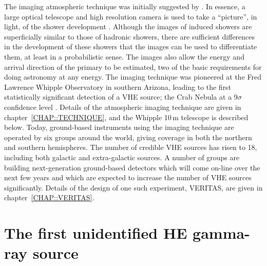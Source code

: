 The imaging atmospheric \Cerenkov technique was initially suggested by
\citet{REF::WEEKES_TURVER::RAGR1977}. In essence, a large optical
telescope and high resolution camera is used to take a ``picture'', in
\Cerenkov light, of the shower development \citep{REF::FEGAN::NIM1983}. 
Although the images of \Gray induced showers are superficially similar
to those of hadronic showers, there are sufficient differences in the
development of these showers that the images can be used to
differentiate them, at least in a probabilistic sense. The images also
allow the energy and arrival direction of the primary \Grays to be
estimated, two of the basic requirements for doing astronomy at any
energy. The imaging technique was pioneered at the Fred Lawrence
Whipple Observatory in southern Arizona, leading to the first
statistically significant detection of a VHE source; the Crab Nebula
at a 9$\sigma$ confidence level \citep{REF::WEEKES::APJ1989}. Details
of the atmospheric imaging technique are given in
chapter~\ref{CHAP::TECHNIQUE}, and the Whipple 10\,m telescope is
described below. Today, ground-based instruments using the imaging
technique are operated by six groups around the world, giving coverage
in both the northern and southern hemispheres. The number of credible
VHE sources has risen to 18, including both galactic and
extra-galactic sources. A number of groups are building
next-generation ground-based detectors which will come on-line over
the next few years and which are expected to increase the number of
VHE sources significantly. Details of the design of one such
experiment, VERITAS, are given in chapter~\ref{CHAP::VERITAS}.

\section{The first unidentified HE gamma-ray source}
\label{SEC::INTRODUCTION::GEMINGA}

